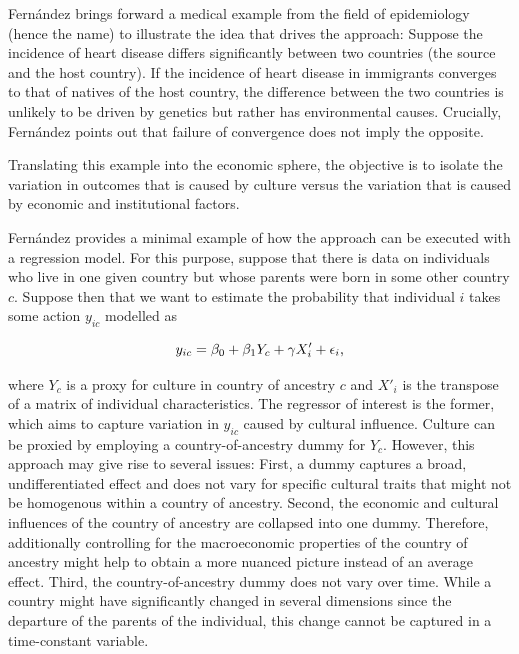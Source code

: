 \documentclass[a4paper, oneside, hyperfootnotes = false]{article}
\begin{document}
{Fernández brings forward a medical example from the field of epidemiology (hence the name) to illustrate the idea that drives the approach:
Suppose the incidence of heart disease differs significantly between two countries (the source and the host country).
If the incidence of heart disease in immigrants converges to that of natives of the host country, the difference between the two countries is unlikely to be driven by genetics but rather has environmental causes.
Crucially, Fernández points out that failure of convergence does not imply the opposite.

Translating this example into the economic sphere, the objective is to isolate the variation in outcomes that is caused by culture versus the variation that is caused by economic and institutional factors.

Fernández provides a minimal example of how the approach can be executed with a regression model.
For this purpose, suppose that there is data on individuals who live in one given country but whose parents were born in some other country $c$.
Suppose then that we want to estimate the probability that individual $i$ takes some action $y_{ic}$ modelled as

\vspace{-8mm}

\begin{equation}
	\label{eq:fernandezexercise}
	y_{ic} = \beta_{0} + \beta_{1}Y_{c} + \gamma{}X'_{i} + \epsilon_{i}\textnormal{,}
\end{equation}

\noindent where $Y_{c}$ is a proxy for culture in country of ancestry $c$ and $X'_{i}$ is the transpose of a matrix of individual characteristics.
The regressor of interest is the former, which aims to capture variation in $y_{ic}$ caused by cultural influence.
Culture can be proxied by employing a country-of-ancestry dummy for $Y_{c}$.
However, this approach may give rise to several issues:
First, a dummy captures a broad, undifferentiated effect and does not vary for specific cultural traits that might not be homogenous within a country of ancestry.
Second, the economic and cultural influences of the country of ancestry are collapsed into one dummy.
Therefore, additionally controlling for the macroeconomic properties of the country of ancestry might help to obtain a more nuanced picture instead of an average effect.
Third, the country-of-ancestry dummy does not vary over time.
While a country might have significantly changed in several dimensions since the departure of the parents of the individual, this change cannot be captured in a time-constant variable.

}
\end{document}
